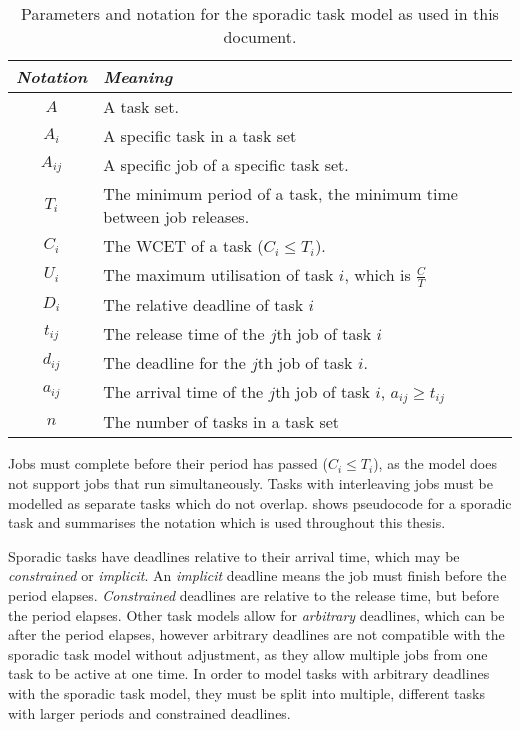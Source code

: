 \begin{table}[b]
\centering
\begin{tabularx}{\textwidth}{cX}\toprule
    \emph{Notation} & \emph{Meaning} \\\midrule
    $A$               & A task set. \\
    $A_{i}$           & A specific task in a task set \\
    $A_{ij}$          & A specific job of a specific task set. \\
    $T_{i}$           & The minimum period of a task, the minimum time between job releases. \\
        $C_{i}$       & The \gls{WCET} of a task ($C_{i} \leq T_{i}$). \\
    $U_{i}$           & The maximum utilisation of task $i$, which is $\frac{C}{T}$ \\
    $D_{i}$           & The relative deadline of task $i$ \\
    $t_{ij}$          & The release time of the $j$th job of task $i$ \\
    $d_{ij}$          & The deadline for the $j$th job of task $i$. \\
    $a_{ij}$          & The arrival time of the $j$th job of task $i$, $a_{ij} \geq t_{ij}$ \\
    $n$               & The number of tasks in a task set\\
    \bottomrule
    \end{tabularx}
    \caption{Parameters and notation for the sporadic task model as used in this document.}
    \label{t:notation}
\end{table}

Jobs must complete before their period has passed ($C_{i} \leq T_{i}$), as the model does not
support jobs that run simultaneously. Tasks with interleaving jobs must be modelled as separate
tasks which do not overlap.   shows pseudocode for a sporadic task and
 summarises the notation which is used throughout this thesis.

Sporadic tasks have deadlines relative to their arrival time, which may be \emph{constrained} or
\emph{implicit}.  An \emph{implicit} deadline means the job must finish before the period elapses.
\emph{Constrained} deadlines are relative to the release time, but before the period elapses.  Other
task models allow for \emph{arbitrary} deadlines, which can be after the period elapses, however
arbitrary deadlines are not compatible with the sporadic task model without adjustment, as they allow multiple jobs from
one task to be active at one time.  In order to model tasks with arbitrary deadlines with the
sporadic task model, they must be split 
into multiple, different tasks with larger periods and
constrained deadlines.

